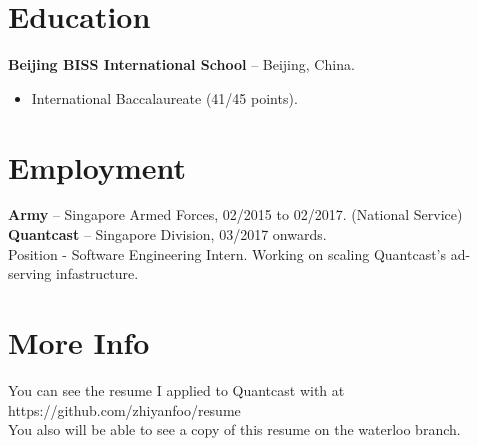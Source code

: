 \documentclass[margin]{res}
\begin{document}
 
\address{
    {\bf Email:} \href{mailto:zhiyanfoo@gmail.com}{\tt zhiyanfoo@gmail.com} \\
    {\bf Website:} \href{https://zhiyanfoo.github.io/}{\tt
    https://zhiyanfoo.github.io/} \\
    {\bf Github:} \href{https://github.com/zhiyanfoo}{\tt
    https://github.com/zhiyanfoo} \\
    {\bf Phone:} +65 84354397 
}

\address{ {\bf Address}\\
  Kang Ching Rd Blk 333 \\
    \# 08-264 \\
  Singapore, 610333
        }
 
\begin{resume} 
 
\section{Education} 
    {\bf Beijing BISS International School} -- Beijing, China.
    \begin{itemize}
        \item International Baccalaureate (41/45 points).
    \end{itemize}

\section{Employment}
    {\bf Army} -- Singapore Armed Forces, 02/2015 to 02/2017. (National
    Service) \\
    {\bf Quantcast} -- Singapore Division, 03/2017 onwards. \\ 
    Position - Software Engineering Intern. Working on scaling Quantcast's ad-serving
    infastructure.

\section{More Info}
    You can see the resume I applied to Quantcast with at https://github.com/zhiyanfoo/resume \\
    You also will be able to see a copy of this resume on the waterloo branch. \\



\end{resume} 
\end{document}
